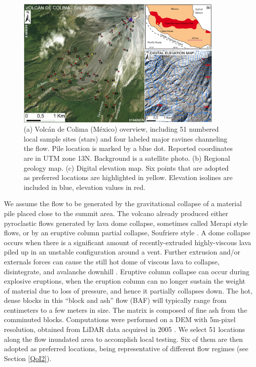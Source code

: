 \documentclass{article}
\begin{document}
\begin{figure}[H]
    \includegraphics[width=0.9\textwidth]{BAF_VolcanDeColima/ColimaFig.jpg}
    \centering
    \caption{(a) Volc{\'a}n de Colima (M{\'e}xico) overview, including 51 numbered local sample sites (stars) and four labeled major ravines channeling the flow. Pile location is marked by a blue dot. Reported coordinates are in UTM zone 13N. Background is a satellite photo. (b) Regional geology map. (c) Digital elevation map. Six points that are adopted as preferred locations are highlighted in yellow. Elevation isolines are included in blue, elevation values in red.}
    \label{fig:Colima-first}
\end{figure}

We assume the flow to be generated by the gravitational collapse of a material pile placed close to the summit area. The volcano already produced either pyroclastic flows generated by lava dome collapse, sometimes called Merapi style flows, or by an eruptive column partial collapse, Soufriere style \citep{Macorps2017}. A dome collapse occurs when there is a significant amount of recently-extruded highly-viscous lava piled up in an unstable configuration around a vent. Further extrusion and/or externals forces can cause the still hot dome of viscous lava to collapse, disintegrate, and avalanche downhill \citep{Bursik2005, Wolpert2016}. Eruptive column collapse can occur during explosive eruptions, when the eruption column can no longer
sustain the weight of material due to loss of pressure, and hence it partially collapses down. The hot, dense blocks in this ``block and ash'' flow (BAF) will typically range from centimeters to a few meters in size. The matrix is composed of fine ash from the comminuted blocks. Computations were performed on a DEM with 5m-pixel resolution, obtained from LiDAR data acquired in 2005 \citep{Davila2007, Sulpizio2010}. We select 51 locations along the flow inundated area to accomplish local testing. Six of them are then adopted as preferred locations, being representative of different flow regimes (see Section \ref{QoI2}).
\end{document}
